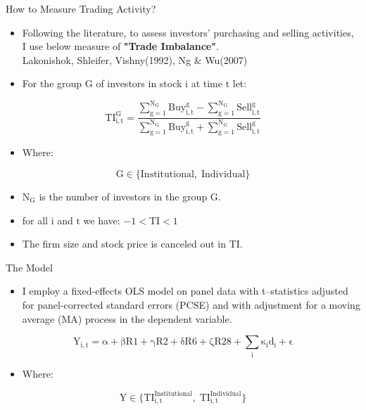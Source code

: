 \documentclass{beamer}
\begin{document}
\begin{frame}{How to Measure Trading Activity?}
    \begin{itemize}
        \item Following the literature, to assess investors' purchasing and selling activities, I use below measure of \textbf{"Trade Imbalance"}.\\Lakonishok, Shleifer, Vishny(1992), Ng \& Wu(2007)
        \item For the group \(\mathrm{G}\) of investors in stock \(\mathrm{i}\) at time \(\mathrm{t}\) let:
    \end{itemize}
    \[
        \mathrm{TI_{i, t}^G=\frac{\sum_{g=1}^{N_G} Buy_{i, t}^g - \sum_{g=1}^{N_G} Sell_{i, t}^g}{\sum_{g=1}^{N_G} Buy_{i, t}^g + \sum_{g=1}^{N_G} Sell_{i, t}^g}}
    \]

    \begin{itemize}
        \item Where:
    \end{itemize}

    \[
        \mathrm{G                     \in  \{Institutional, \; Individual\}}
    \]

    \begin{itemize}
        \item \(\mathrm{N_G}\) is the number of investors in the group \(\mathrm{G}\).
        \item for all \(\mathrm{i}\) and \(\mathrm{t}\) we have: \(-1 < \mathrm{TI} < 1\)
        \item The firm size and stock price is canceled out in \(\mathrm{TI}\).
    \end{itemize}

\end{frame}

\begin{frame}
    \begin{block}{The Model}
        \begin{itemize}
            \item I employ a fixed-effects OLS model on panel data with t–statistics adjusted for panel-corrected standard errors (PCSE) and with adjustment for a moving average (MA) process in the dependent variable.
        \end{itemize}
        \[
            \mathrm{Y_{i,t} = \alpha + \beta R1 + \gamma R2 + \delta R6 + \zeta R28 + \sum_i \kappa_i d_i + \epsilon}
        \]
        \begin{itemize}
            \item Where:
        \end{itemize}
        \[
            \mathrm{Y \in \{{TI}_{i,t}^{Institutional}, \; {TI}_{i,t}^{Individual}\}}
        \]
    \end{block}
\end{frame}
\end{document}
